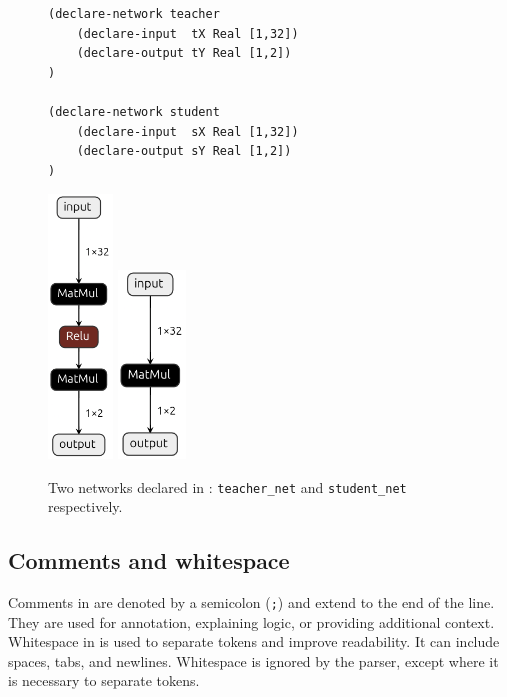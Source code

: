\begin{figure}[h!]
    \begin{minipage}[c]{0.6\textwidth}
        \begin{lstlisting}[style=lbnf]
(declare-network teacher
    (declare-input  tX Real [1,32])
    (declare-output tY Real [1,2])
)

(declare-network student
    (declare-input  sX Real [1,32])
    (declare-output sY Real [1,2])
)\end{lstlisting}
    \end{minipage}
    \begin{minipage}[c]{0.4\textwidth}
        \centering
        \includegraphics[height=7cm]{imgs/teacher_net.onnx.png}
        \vspace{0.5cm} 
        \includegraphics[height=5cm]{imgs/student_net.onnx.png}
    \end{minipage}
    \caption{Two networks declared in \vnnlib{}: \texttt{teacher\_net} and \texttt{student\_net} respectively.}
    \label{fig:multiple-networks}
\end{figure}


\subsection{Comments and whitespace}

Comments in \vnnlib{} are denoted by a semicolon (\texttt{;}) and extend to the end of the line. They are used for annotation, explaining logic, or providing additional context. Whitespace in \vnnlib{} is used to separate tokens and improve readability. It can include spaces, tabs, and newlines. Whitespace is ignored by the parser, except where it is necessary to separate tokens.


